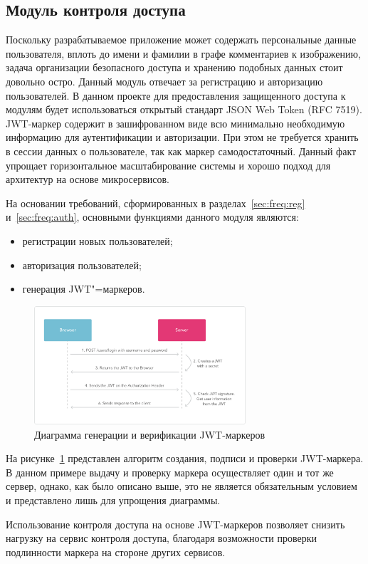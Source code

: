 \subsection{Модуль контроля доступа}
Поскольку разрабатываемое приложение может содержать персональные данные пользователя, вплоть до имени и фамилии в графе комментариев к изображению, задача организации безопасного доступа и хранению подобных данных стоит довольно остро.
Данный модуль отвечает за регистрацию и авторизацию пользователей. 
В данном проекте для предоставления защищенного доступа к модулям будет использоваться открытый стандарт JSON Web Token (RFC 7519). JWT-маркер  содержит в зашифрованном виде всю минимально необходимую информацию для аутентификации и авторизации. При этом не требуется хранить в сессии данных о пользователе, так как маркер самодостаточный. Данный факт упрощает горизонтальное масштабирование системы и хорошо подход для архитектур на основе микросервисов.

На основании требований, сформированных в разделах~\ref{sec:freq:reg} и~\ref{sec:freq:auth}, основными функциями данного модуля являются:
\begin{itemize}
  \item регистрации новых пользователей;
  \item авторизация пользователей;
  \item генерация JWT"=маркеров.
\end{itemize}

\begin{figure}[ht]
    \centering
    \includegraphics[width=0.7\textwidth]{figures/jwt_diagram.png}
    \caption{Диаграмма генерации и верификации JWT-маркеров}
    \label{fig:architecture:jwt_diagram}
\end{figure}

На рисунке~\ref{fig:architecture:jwt_diagram} представлен алгоритм создания, подписи и проверки JWT-маркера. В данном примере выдачу и проверку маркера осуществляет один и тот же сервер, однако, как было описано выше, это не является обязательным условием и представлено лишь для упрощения диаграммы.

Использование контроля доступа на основе JWT-маркеров позволяет снизить нагрузку на сервис контроля доступа, благодаря возможности проверки подлинности маркера на стороне других сервисов.